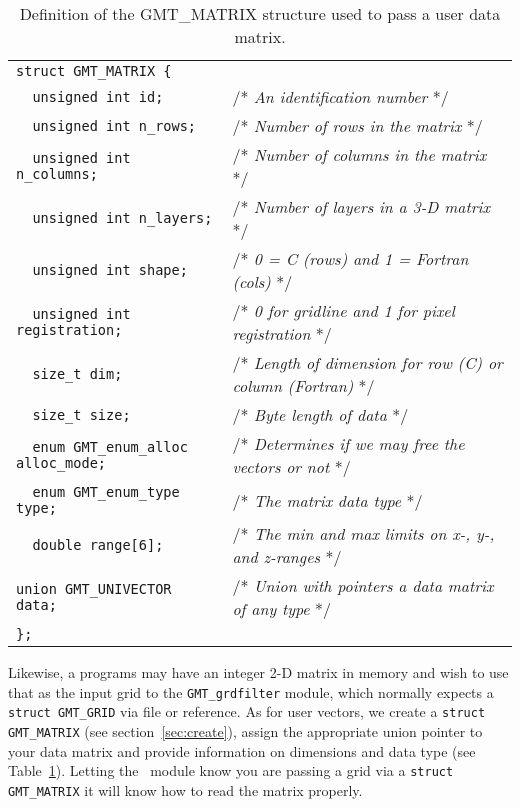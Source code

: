 \documentclass[11pt]{report}
\begin{document}
\begin{table}[h]
\small
\centering
\begin{tabular}{ll} \hline
\verb!struct GMT_MATRIX {!               & \\
\verb!  unsigned int id;!                & /* \emph{An identification number} */ \\
\verb!  unsigned int n_rows;!            & /* \emph{Number of rows in the matrix} */ \\
\verb!  unsigned int n_columns;!         & /* \emph{Number of columns in the matrix} */\\
\verb!  unsigned int n_layers;!          & /* \emph{Number of layers in a 3-D matrix} */\\
\verb!  unsigned int shape;!             & /* \emph{0 = C (rows) and 1 = Fortran (cols)} */\\
\verb!  unsigned int registration;!      & /* \emph{0 for gridline and 1 for pixel registration} */\\
\verb!  size_t dim;!                     & /* \emph{Length of dimension for row (C) or column (Fortran)} */\\
\verb!  size_t size;!                    & /* \emph{Byte length of data} */\\
\verb!  enum GMT_enum_alloc alloc_mode;! & /* \emph{Determines if we may free the vectors or not} */\\
\verb!  enum GMT_enum_type type;!        & /* \emph{The matrix data type} */\\
\verb!  double range[6];!                & /* \emph{The min and max limits on x-, y-, and z-ranges} */\\
\verb!union GMT_UNIVECTOR data;!       & /* \emph{Union with pointers a data matrix of any type} */\\
\verb!};!                              & \\ \hline
\end{tabular}
\caption{Definition of the GMT\_MATRIX structure used to pass a user data matrix.}
\label{tbl:matrix}
\end{table}
\noindent
Likewise, a programs may have an integer 2-D matrix in memory 
and wish to use that as the input grid to the \texttt{GMT\_grdfilter} module, which normally
expects a \texttt{struct GMT\_GRID} via file or reference.  As for user vectors, we create a
\texttt{struct GMT\_MATRIX} (see section~\ref{sec:create}), assign the appropriate union pointer to your data
matrix and provide information on dimensions and data type (see Table~\ref{tbl:matrix}).
Letting the \GMT\ module know you are passing a grid via a
\texttt{struct GMT\_MATRIX} it will know how to read the matrix properly.
\end{document}
